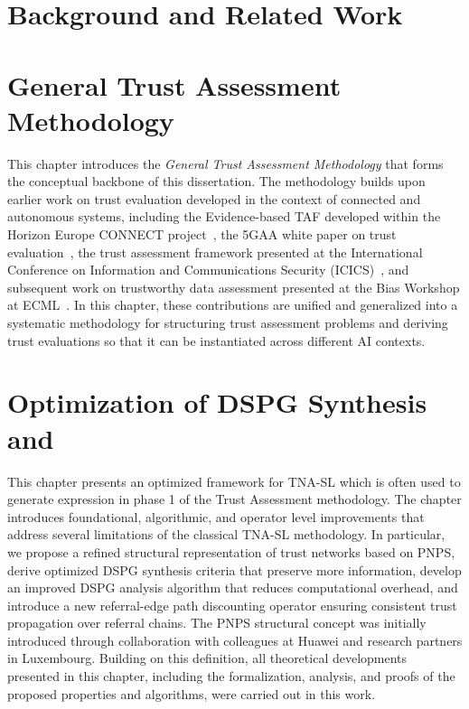 \setcounter{chapter}{1}
\chapter{Background and Related Work}

\chapter{General Trust Assessment Methodology }
This chapter introduces the \emph{General Trust Assessment Methodology} that forms the conceptual backbone of this dissertation. 
The methodology builds upon earlier work on trust evaluation developed in the context of connected and autonomous systems, including the Evidence-based \ac{TAF} developed within the Horizon Europe CONNECT project~\cite{connect_d31_taf}, the 5GAA white paper on trust evaluation~\cite{5gaa_trust4cav_2025}, the trust assessment framework presented at the International Conference on Information and Communications Security (ICICS)~\cite{fotos2025actions}, and subsequent work on trustworthy data assessment presented at the Bias Workshop at ECML~\cite{10.1007/978-3-032-19096-3_17}. 
In this chapter, these contributions are unified and generalized into a systematic methodology for structuring trust assessment problems and deriving trust evaluations so that it can be instantiated across different \ac{AI} contexts.



\chapter{Optimization of \acs{DSPG} Synthesis and }
This chapter presents an optimized framework for \acf{TNA-SL} which is often used to generate expression in phase 1 of the Trust Assessment methodology. The chapter introduces foundational, algorithmic, and operator level improvements that address several limitations of the classical \ac{TNA-SL} methodology. In particular, we propose a refined structural representation of trust networks based on \acf{PNPS}, derive optimized \ac{DSPG} synthesis criteria that preserve more information, develop an improved \ac{DSPG} analysis algorithm that reduces computational overhead, and introduce a new referral-edge path discounting operator ensuring consistent trust propagation over referral chains. The \acf{PNPS} structural concept was initially introduced through collaboration with colleagues at Huawei and research partners in Luxembourg. Building on this definition, all theoretical developments presented in this chapter, including the formalization, analysis, and proofs of the proposed properties and algorithms, were carried out in this work.

